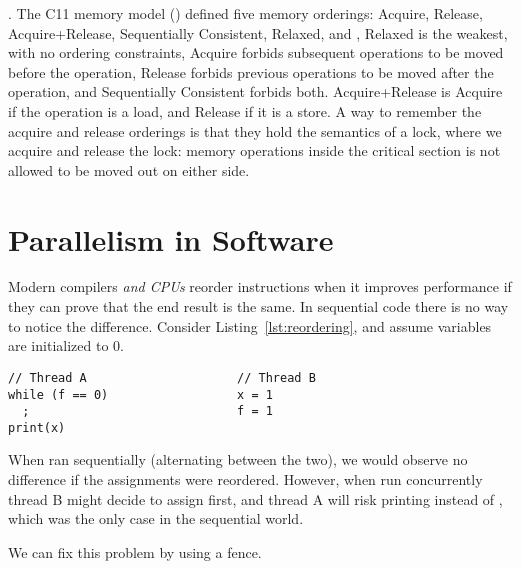 \documentclass[b5paper,twoside]{report}
\begin{document}
.
The C11 memory model () defined five memory orderings:
Acquire, Release, Acquire+Release, Sequentially Consistent, Relaxed, and
,
Relaxed is the weakest, with no ordering constraints,
Acquire forbids subsequent operations to be moved before the operation,
Release forbids previous operations to be moved after the operation,
and Sequentially Consistent forbids both.
Acquire+Release is Acquire if the operation is a load,
and Release if it is a store.
A way to remember the acquire and release orderings is that they
hold the semantics of a lock, where we acquire and release the lock:
memory operations inside the critical section is not allowed to be
moved out on either side.









\section{Parallelism in Software}

Modern compilers \emph{and CPUs} reorder instructions when it improves
performance if they can prove that the end result is the same.
In sequential code there is no way to notice the difference.
Consider Listing~\ref{lst:reordering}, and assume variables
are initialized to 0.
\begin{lstlisting}[caption=Instruction reordering,label=lst:reordering]
// Thread A                     // Thread B
while (f == 0)                  x = 1
  ;                             f = 1
print(x)
\end{lstlisting}
When ran sequentially (alternating between the two), we would observe
no difference if the assignments were reordered. However, when run
concurrently thread B might decide to assign  first,
and thread A will risk printing  instead of ,
which was the only case in the sequential world.

We can fix this problem by using a fence.
\end{document}
